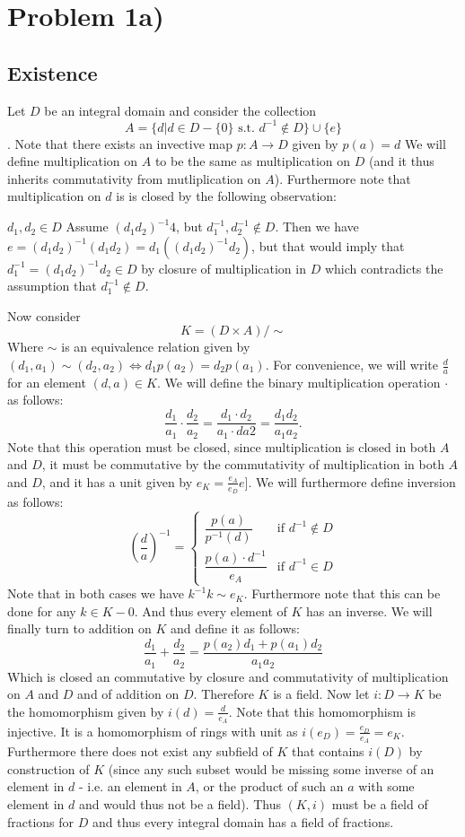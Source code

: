 
\section*{Problem 1a)}
\subsection*{Existence}
Let $D$ be an integral domain and consider the collection 
\[ A = \{ d | d\in D-\{0\} \text{ s.t. } d^{-1} \notin D \} \cup \{e\} \]
. Note that there exists an invective map $p: A\to D$ given by $p(a)=d$
We will define multiplication on $A$ to be the same as multiplication on $D$ (and it thus inherits commutativity from mutliplication on $A$). Furthermore note that multiplication on $d$ is is closed by the following observation: \par $d_1,d_2 \in D$ Assume $(d_1d_2)^{-1}4$, but $d_1^{-1}, d_2^{-1} \notin D$. Then we have $e=(d_1d_2)^{-1}(d_1d_2)= d_1((d_1d_2)^{-1}d_2)$, but that would imply that $d_1^{-1} = (d_1d_2)^{-1}d_2 \in D$ by closure of multiplication in $D$ which contradicts the assumption that $d_1^{-1}\notin D$. \par 
Now consider 
\[ K = (D \times A)/\sim\]
Where $\sim$ is an equivalence relation given by $(d_1,a_1)\sim (d_2,a_2) \iff d_1p(a_2) = d_2p(a_1)$. For convenience, we will write $\frac{d}{a}$ for an element $(d,a)\in K$. We will define the binary multiplication operation $\cdot$ as follows:
 \[\frac{d_1}{a_1} \cdot \frac{d_2}{a_2} = \frac{d_1\cdot d_2}{a_1\cdot da2} = \frac{d_1d_2}{a_1a_2}.\]
 Note that this operation must be closed, since multiplication is closed in both $A$ and $D$, it must be commutative by the commutativity of multiplication in both $A$ and $D$, and it has a unit given by $e_K=\frac{e_A}{e_D}e]$. We will furthermore define inversion as follows:
\[ \left(\frac{d}{a}\right)^{-1} = \begin{cases} \dfrac{p(a)}{p^{-1}(d)} &\mbox{if } d^{-1} \notin D \\
\dfrac{p(a)\cdot d^{-1}}{e_A} & \mbox{if } d^{-1}\in D \end{cases} \]
Note that in both cases we have $k^{-1}k \sim e_K$. Furthermore note that this can be done for any $k\in K-0$. And thus every element of $K$ has an inverse.
We will finally turn to addition on $K$ and define it as follows:
\[ \frac{d_1}{a_1} + \frac{d_2}{a_2} = \frac{p(a_2)d_1 + p(a_1)d_2}{a_1a_2} \]
Which is closed an commutative by closure and commutativity of multiplication on $A$ and $D$ and of addition on $D$. Therefore $K$ is a field.
Now let $i: D\to K$ be the homomorphism given by $i(d)=\frac{d}{e_A}$. Note that this homomorphism is injective. It is a homomorphism of rings with unit as $i(e_D) = \frac{e_D}{e_A} = e_K$. Furthermore there does not exist any subfield of $K$ that contains $i(D)$ by construction of $K$ (since any such subset would be missing some inverse of an element in $d$   - i.e. an element in $A$, or the product of such an $a$ with some element in $d$ and would thus not be a field). Thus $(K,i)$ must be a field of fractions for $D$ and thus every integral domain has a field of fractions. \par 
